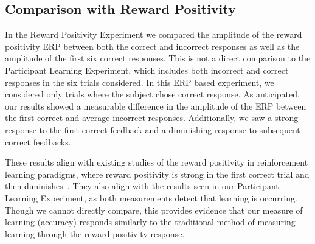 
\subsection{Comparison with Reward Positivity}
In the Reward Positivity Experiment we compared the amplitude of the reward positivity ERP between both the correct and incorrect responses as well as the amplitude of the first six correct responses. This is not a direct comparison to the Participant Learning Experiment, which includes both incorrect and correct responses in the six trials considered. In this ERP based experiment, we considered only trials where the subject chose correct response.  As anticipated, our results showed a measurable difference in the amplitude of the ERP between the first correct and average incorrect responses. Additionally, we saw a strong response to the first correct feedback and a diminishing response to subsequent correct feedbacks.

These results align with existing studies of the reward positivity in reinforcement learning paradigms, where reward positivity is strong in the first correct trial and then diminishes~\cite{krigolson2014we,krigolson2009learning,bellebaum2014feedback}. They also align with the results seen in our Participant Learning Experiment, as both measurements detect that learning is occurring. Though we cannot directly compare, this provides evidence that our measure of learning (\tvt accuracy) responds similarly to the traditional method of measuring learning through the reward positivity response.
